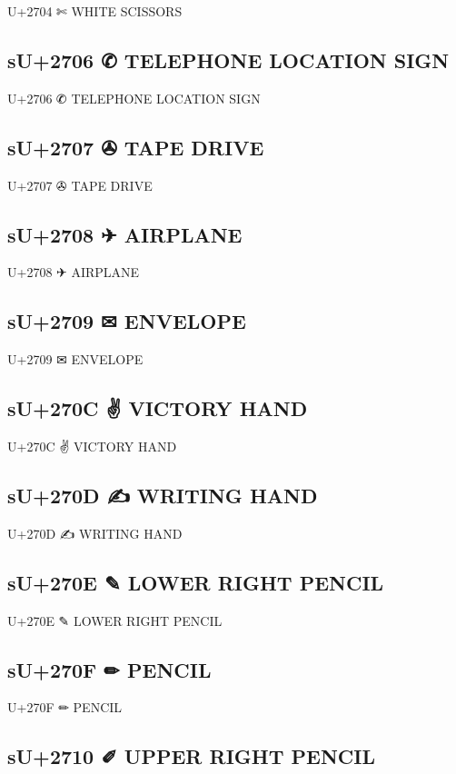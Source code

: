 U+2704 ✄ WHITE SCISSORS

\subsection{sU+2706 ✆ TELEPHONE LOCATION SIGN}

U+2706 ✆ TELEPHONE LOCATION SIGN

\subsection{sU+2707 ✇ TAPE DRIVE}

U+2707 ✇ TAPE DRIVE

\subsection{sU+2708 ✈ AIRPLANE}

U+2708 ✈ AIRPLANE

\subsection{sU+2709 ✉ ENVELOPE}

U+2709 ✉ ENVELOPE

\subsection{sU+270C ✌ VICTORY HAND}

U+270C ✌ VICTORY HAND

\subsection{sU+270D ✍ WRITING HAND}

U+270D ✍ WRITING HAND

\subsection{sU+270E ✎ LOWER RIGHT PENCIL}

U+270E ✎ LOWER RIGHT PENCIL

\subsection{sU+270F ✏ PENCIL}

U+270F ✏ PENCIL

\subsection{sU+2710 ✐ UPPER RIGHT PENCIL}

